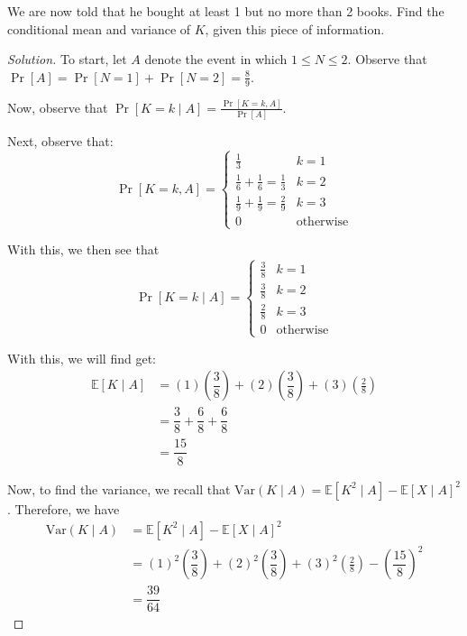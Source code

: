 \documentclass{article}
\newenvironment{solution}{\begin{proof}[Solution]}{\end{proof}}
\newcommand{\E}{\mathbb{E}}
\newcommand{\Var}{\mathrm{Var}}
\begin{document}
\begin{hw}
	We are now told that he bought at least 1 but no more than 2 books. Find the conditional mean and variance of $K$, given this piece of information.
\end{hw}
\begin{solution}
	To start, let $A$ denote the event in which $1 \leq N \leq 2$. Observe that $\Pr[A] = \Pr[N = 1] + \Pr[N = 2] = \frac{8}{9}$.
	
	Now, observe that $\Pr[K = k \mid A] = \frac{\Pr[K = k, A]}{\Pr[A]}$.
	
	Next, observe that:
	\[
	\Pr[K=k, A] =
	\begin{cases}
		\frac{1}{3} & k = 1 \\
		\frac{1}{6} + \frac{1}{6} = \frac{1}{3} & k = 2 \\
		\frac{1}{9} + \frac{1}{9} = \frac{2}{9} & k = 3 \\
		0 & \text{otherwise}
	\end{cases}
	\]
	
	With this, we then see that
	\[
	\Pr[K = k \mid A] =
	\begin{cases}
		\frac{3}{8} & k = 1 \\
		\frac{3}{8} & k = 2 \\
		\frac{2}{8} & k = 3 \\
		0 & \text{otherwise}
	\end{cases}
	\]
	
	With this, we will find get:
	\begin{align*}
		\E[K \mid A] &= \left( 1 \right)\left( \dfrac{3}{8} \right) + \left( 2 \right)\left( \dfrac{3}{8} \right) + \left( 3 \right)\left( \frac{2}{8} \right) \\
		&= \dfrac{3}{8} + \dfrac{6}{8} + \dfrac{6}{8} \\
		&= \dfrac{15}{8}
	\end{align*}

	Now, to find the variance, we recall that $\Var(K \mid A) = \E[K^{2} \mid A] - \E[X \mid A]^{2}$. Therefore, we have
	\begin{align*}
		\Var(K \mid A) &= \E[K^{2} \mid A] - \E[X \mid A]^{2} \\
		&= \left( 1 \right)^{2}\left( \dfrac{3}{8} \right) + \left( 2 \right)^{2}\left( \dfrac{3}{8} \right) + \left( 3 \right)^{2}\left( \frac{2}{8} \right) - \left( \dfrac{15}{8} \right)^{2} \\
		&= \dfrac{39}{64}
	\end{align*}
\end{solution}
\end{document}
